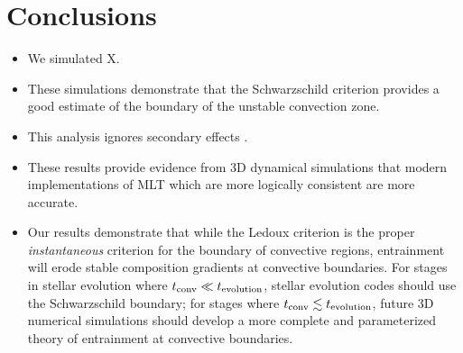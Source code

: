 \section{Conclusions}
\label{sec:conclusions}

\begin{itemize}
    \item We simulated X.
    \item These simulations demonstrate that the Schwarzschild criterion provides a good estimate of the boundary of the unstable convection zone.
    \item This analysis ignores secondary effects \citep[e.g., convective penetration][because we designed our experiments to minimize these effects]{anders_etal_2022}.
    \item These results provide evidence from 3D dynamical simulations that modern implementations of MLT \citep{mesa4, mesa5} which are more logically consistent \citep{gabriel_etal_2014} are more accurate.
    \item Our results demonstrate that while the Ledoux criterion is the proper \emph{instantaneous} criterion for the boundary of convective regions, entrainment will erode stable composition gradients at convective boundaries.
        For stages in stellar evolution where $t_{\rm{conv}} \ll t_{\rm{evolution}}$, stellar evolution codes should use the Schwarzschild boundary; for stages where $t_{\rm{conv}} \lesssim t_{\rm{evolution}}$, future 3D numerical simulations should develop a more complete and parameterized theory of entrainment at convective boundaries.
\end{itemize}

